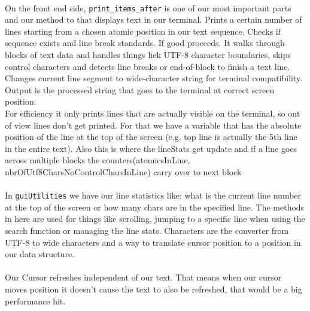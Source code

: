 \noindent
\\On the front end side, \verb|print_items_after| is one of our most important parts and our method to that displays text in our terminal. Prints a certain number of lines starting from a chosen atomic position in our text sequence.
Checks if sequence exists and line break standards. If good proceeds. It walks through blocks of text data and handles things liek UTF-8 character boundaries, skips control characters and detects line breaks or end-of-block to finish a text line.
\\Changes current line segment to wide-character string for terminal compatibility.
Output is the processed string that goes to the terminal at correct screen position.
\\For efficiency it only prints lines that are actually visible on the terminal, so out of view lines don't get printed. For that we have a variable that has the absolute position of the line at the top of the screen (e.g. top line is actually the 5th line in the entire text).
Also this is where the lineStats get update and if a line goes across multiple blocks the counters(atomicsInLine, nbrOfUtf8CharsNoControlCharsInLine) carry over to next block
\\
\\In \verb|guiUtilities| we have our line statistics like: what is the current line number at the top of the screen or how many chars are in the specified line. The methods in here are used for things like scrolling, jumping to a specific line when using the search function or managing the line stats.
Characters are the converter from UTF-8 to wide characters and a way to translate cursor position to a position in our data structure.
\\
\\Our Cursor refreshes independent of our text. That means when our cursor moves position it doesn't cause the text to also be refreshed, that would be a big performance hit.